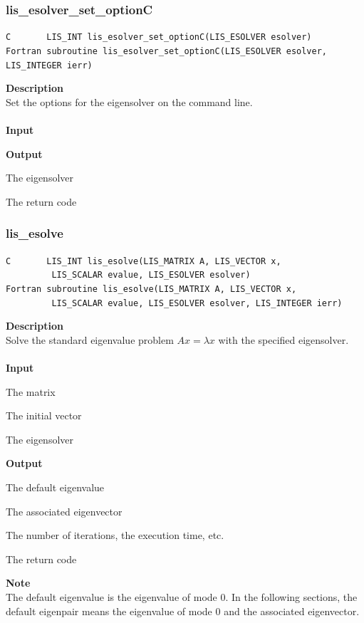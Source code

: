 \documentclass[a4paper]{article}
\newcommand{\namelistlabel}[1]{\mbox{#1}\hfill}
\newenvironment{namelist}[1]{%
\begin{list}{}
  {\let\makelabel\namelistlabel
  \settowidth{\labelwidth}{#1}
  \setlength{\leftmargin}{1.1\labelwidth}}
  }{%
\end{list}}
\begin{document}
\newpage
\subsubsection{lis\_esolver\_set\_optionC}
\begin{screen}
\verb|C       LIS_INT lis_esolver_set_optionC(LIS_ESOLVER esolver)|\\
\verb|Fortran subroutine lis_esolver_set_optionC(LIS_ESOLVER esolver, LIS_INTEGER ierr)|
\end{screen}
{\bf Description}\\
\indent
Set the options for the eigensolver on the command line.
\\ \\
\noindent
{\bf Input}
\begin{namelist}{XXXXXXXXXXXXXXXXXXXX}
\item[None]
\end{namelist}
{\bf Output}
\begin{namelist}{XXXXXXXXXXXXXXXXXXXX}
\item[\tt esolver] The eigensolver
\item[\tt ierr] The return code
\end{namelist}

\subsubsection{lis\_esolve}
\begin{screen}
\verb|C       LIS_INT lis_esolve(LIS_MATRIX A, LIS_VECTOR x,|\\ 
\verb|         LIS_SCALAR evalue, LIS_ESOLVER esolver)|\\
\verb|Fortran subroutine lis_esolve(LIS_MATRIX A, LIS_VECTOR x,|\\
\verb|         LIS_SCALAR evalue, LIS_ESOLVER esolver, LIS_INTEGER ierr)|
\end{screen}
{\bf Description}\\
\indent
Solve the standard eigenvalue problem $Ax = \lambda x$ with the specified eigensolver.
\\ \\
\noindent
{\bf Input}
\begin{namelist}{XXXXXXXXXXXXXXXXXXXX}
\item[\tt A] The matrix
\item[\tt x] The initial vector
\item[\tt esolver] The eigensolver
\end{namelist}
{\bf Output}
\begin{namelist}{XXXXXXXXXXXXXXXXXXXX}
\item[\tt evalue] The default eigenvalue
\item[\tt x] The associated eigenvector
\item[\tt esolver] The number of iterations, the execution time, etc.
\item[\tt ierr] The return code
\end{namelist}
{\bf Note}\\
\indent
The default eigenvalue is the eigenvalue of mode 0. In the following sections, the default eigenpair means the eigenvalue of mode 0 and the associated eigenvector.
\end{document}

